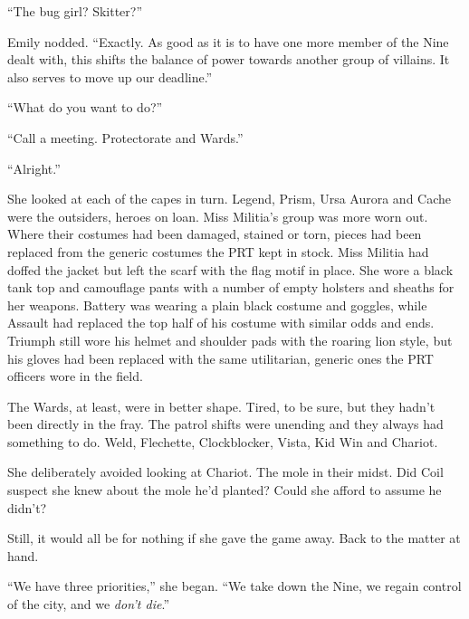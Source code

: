``The bug girl?  Skitter?''



Emily nodded.  ``Exactly.  As good as it is to have one more member of the Nine dealt with, this shifts the balance of power towards another group of villains.  It also serves to move up our deadline.''



``What do you want to do?''



``Call a meeting.  Protectorate and Wards.''



``Alright.''



\sectionbreak



She looked at each of the capes in turn.  Legend, Prism, Ursa Aurora and Cache were the outsiders, heroes on loan.  Miss Militia's group was more worn out.  Where their costumes had been damaged, stained or torn, pieces had been replaced from the generic costumes the PRT kept in stock.  Miss Militia had doffed the jacket but left the scarf with the flag motif in place.  She wore a black tank top and camouflage pants with a number of empty holsters and sheaths for her weapons.  Battery was wearing a plain black costume and goggles, while Assault had replaced the top half of his costume with similar odds and ends.  Triumph still wore his helmet and shoulder pads with the roaring lion style, but his gloves had been replaced with the same utilitarian, generic ones the PRT officers wore in the field.



The Wards, at least, were in better shape.  Tired, to be sure, but they hadn't been directly in the fray.  The patrol shifts were unending and they always had something to do.  Weld, Flechette, Clockblocker, Vista, Kid Win and Chariot.



She deliberately avoided looking at Chariot.  The mole in their midst.  Did Coil suspect she knew about the mole he'd planted?  Could she afford to assume he didn't?



Still, it would all be for nothing if she gave the game away.  Back to the matter at hand.



``We have three priorities,'' she began.  ``We take down the Nine, we regain control of the city, and we \emph{don't die}.''



